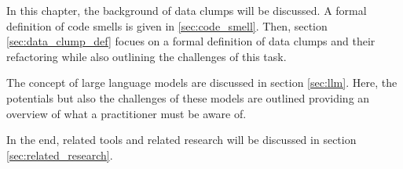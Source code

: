 

In this chapter, the background of data clumps will be discussed. A formal definition of code smells is given in \ref{sec:code_smell}. Then, section \ref{sec:data_clump_def} focues on a formal definition of data clumps and their refactoring while also outlining the challenges of this task.

The concept of large language models are discussed in section \ref{sec:llm}. Here, the potentials but also the challenges of these models are outlined providing an overview of what a practitioner must be aware of.

In the end, related tools and related research will be discussed in section \ref{sec:related_research}. 








\begin{comment}
\section{Related work}
Since refactoring code smells is becoming increasingly important for developers, a variety of research has been conducted to study how the refactoring process can be improved.

Furthermore, tools have been developed that on their own cannot refactor code smells but can be adapted and used to ease developing refactoring tools.

Additionally, the use of \ac{LLM} in software development has recently gained widespread attention and has become a focus of several studies which analyzes the potential and challenges in practice. 

\subsection{Tools to assists data clump refactoring}





\end{comment}